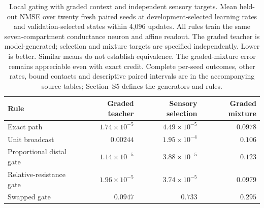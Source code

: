 \begin{table}[!htbp]
\centering
\caption{Local gating with graded context and independent sensory targets.
Mean held-out NMSE over twenty fresh paired seeds at development-selected
learning rates and validation-selected states within 4,096 updates. All rules
train the same seven-compartment conductance neuron and affine readout.
The graded teacher is model-generated; selection and mixture targets are
specified independently. Lower is better. Similar means do not establish
equivalence. The graded-mixture error remains appreciable even with exact
credit. Complete per-seed outcomes, other rates, bound contacts and descriptive
paired intervals are in the accompanying source tables; Section~S5 defines
the generators and rules.}
\label{tab:gate_generalization}
\small
\begin{tabular}{lrrr}
\toprule
Rule & Graded teacher & Sensory selection & Graded mixture \\
\midrule
Exact path & $1.74\times10^{-5}$ & $4.49\times10^{-5}$ & $0.0978$ \\
Unit broadcast & $0.00244$ & $1.95\times10^{-4}$ & $0.106$ \\
Proportional distal gate & $1.14\times10^{-5}$ & $3.88\times10^{-5}$ & $0.123$ \\
Relative-resistance gate & $1.96\times10^{-5}$ & $3.74\times10^{-5}$ & $0.0979$ \\
Swapped gate & $0.0947$ & $0.733$ & $0.295$ \\
\bottomrule
\end{tabular}
\end{table}
